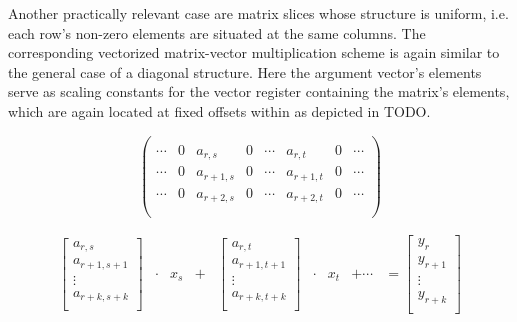 \documentclass{article}
\begin{document}
      Another practically relevant case are matrix slices whose structure is uniform, i.e. each row's non-zero elements are situated at the same columns. The corresponding vectorized matrix-vector multiplication scheme is again similar to the general case of a diagonal structure. Here the argument vector's elements serve as scaling constants for the vector register containing the matrix's elements, which are again located at fixed offsets within \V  as depicted in TODO.

      \begin{equation}
        \begin{pmatrix}
          \\
          \cdots & 0 & a_{r,s} &  0 & \cdots & a_{r,t} & 0 & \cdots \\
          \cdots & 0 & a_{r+1,s} & 0 & \cdots & a_{r+1,t} & 0 & \cdots \\
          \cdots & 0 & a_{r+2,s} & 0 & \cdots & a_{r+2,t} & 0 & \cdots \\
          \\
        \end{pmatrix}
      \end{equation}

      \begin{equation}
        \begin{matrix}
          \begin{bmatrix}
            a_{r,s}     \\
            a_{r+1,s+1} \\
               \vdots   \\
            a_{r+k,s+k} \\
          \end{bmatrix} & \cdot & x_s & + & \begin{bmatrix}
                                              a_{r,t}     \\
                                              a_{r+1,t+1} \\
                                                \vdots    \\
                                              a_{r+k,t+k} \\
                                            \end{bmatrix} & \cdot & x_t & + \cdots & = \begin{bmatrix}
                                                                                       y_{r} \\
                                                                                       y_{r+1} \\
                                                                                       \vdots \\
                                                                                       y_{r+k} \\
                                                                                     \end{bmatrix}
        \end{matrix}
      \end{equation}
\end{document}
